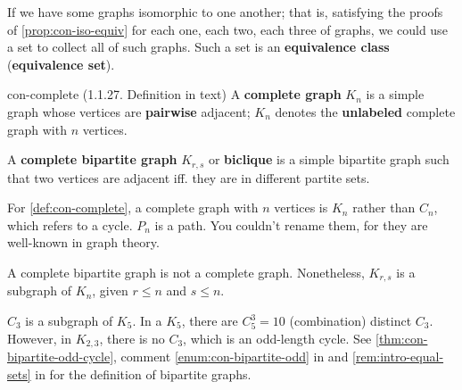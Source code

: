 \documentclass[../src/handouts/main.tex]{subfiles}
\begin{document}
If we have some graphs isomorphic to one another; that is, satisfying the proofs of \cref{prop:con-iso-equiv} for each one, each two, each three of graphs, we could use a set to collect all of such graphs. Such a set is an \textbf{equivalence class} (\textbf{equivalence set}). 

\begin{definition}{}{con-complete}
  (1.1.27. Definition in text)
  A \textbf{complete graph} $K_n$ is a simple graph whose vertices are \textbf{pairwise} adjacent; $K_n$ denotes the \textbf{unlabeled} complete graph with $n$ vertices.

  A \textbf{complete bipartite graph} $K_{r,s}$ or \textbf{biclique} is a simple bipartite graph such that two vertices are adjacent iff. they are in different partite sets.
\end{definition}

For \cref{def:con-complete}, a complete graph with $n$ vertices is $K_n$ rather than $C_n$, which refers to a cycle. $P_n$ is a path. You couldn't rename them, for they are well-known in graph theory.

A complete bipartite graph is not a complete graph. Nonetheless, $K_{r,s}$ is a subgraph of $K_n$, given $r \leq n$ and $s \leq n$.

$C_3$ is a subgraph of $K_5$. In a $K_5$, there are $C_5^3 = 10$ (combination) distinct $C_3$. However, in $K_{2,3}$, there is no $C_3$, which is an odd-length cycle. See \cref{thm:con-bipartite-odd-cycle}, comment \ref{enum:con-bipartite-odd} in  and \cref{rem:intro-equal-sets} in  for the definition of bipartite graphs.
\end{document}
